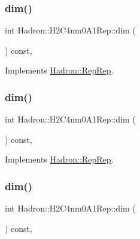 \subsubsection{\texorpdfstring{dim()}{dim()}\hspace{0.1cm}{\footnotesize\ttfamily [3/5]}}
{\footnotesize\ttfamily int Hadron\+::\+H2\+C4nm0\+A1\+Rep\+::dim (\begin{DoxyParamCaption}{ }\end{DoxyParamCaption}) const\hspace{0.3cm}{\ttfamily [inline]}, {\ttfamily [virtual]}}



Implements \mbox{\hyperlink{structHadron_1_1RepRep_a92c8802e5ed7afd7da43ccfd5b7cd92b}{Hadron\+::\+Rep\+Rep}}.

\mbox{\label{structHadron_1_1H2C4nm0A1Rep_a70c05d0b9c939701dadbedc28475a911}} 
\subsubsection{\texorpdfstring{dim()}{dim()}\hspace{0.1cm}{\footnotesize\ttfamily [4/5]}}
{\footnotesize\ttfamily int Hadron\+::\+H2\+C4nm0\+A1\+Rep\+::dim (\begin{DoxyParamCaption}{ }\end{DoxyParamCaption}) const\hspace{0.3cm}{\ttfamily [inline]}, {\ttfamily [virtual]}}



Implements \mbox{\hyperlink{structHadron_1_1RepRep_a92c8802e5ed7afd7da43ccfd5b7cd92b}{Hadron\+::\+Rep\+Rep}}.

\mbox{\label{structHadron_1_1H2C4nm0A1Rep_a70c05d0b9c939701dadbedc28475a911}} 
\subsubsection{\texorpdfstring{dim()}{dim()}\hspace{0.1cm}{\footnotesize\ttfamily [5/5]}}
{\footnotesize\ttfamily int Hadron\+::\+H2\+C4nm0\+A1\+Rep\+::dim (\begin{DoxyParamCaption}{ }\end{DoxyParamCaption}) const\hspace{0.3cm}{\ttfamily [inline]}, {\ttfamily [virtual]}}



